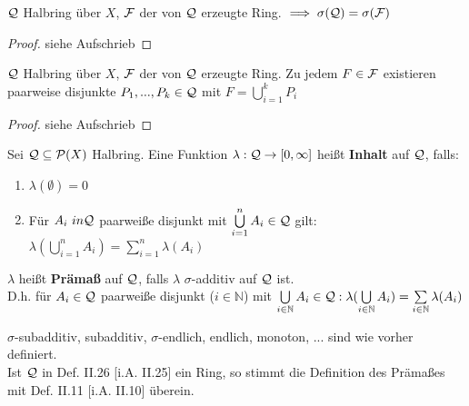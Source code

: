 \documentclass[11pt,a4paper,fleqn,openany]{report}
\begin{document}
    \begin{lemma}[i.A. II.23]
      $\mathcal{Q}$ Halbring über $X$, $\mathcal{F}$ der von $\mathcal{Q}$ erzeugte Ring. $\implies \sigma(\mathcal{Q}) = \sigma(\mathcal{F})$
    \end{lemma}

    \begin{proof}
      siehe Aufschrieb
    \end{proof}

    \begin{lemma}[i.A. II.24]
      $\mathcal{Q}$ Halbring über $X$, $\mathcal{F}$ der von $\mathcal{Q}$ erzeugte Ring. Zu jedem $F \in \mathcal{F}$ existieren paarweise disjunkte $P_1, ..., P_k \in \mathcal{Q}$ mit $F = \bigcup\limits_{i=1}^k P_i$
    \end{lemma}

    \begin{proof}
      siehe Aufschrieb
    \end{proof}

    \begin{definition}[i.A. II.25]
      Sei $\mathcal{Q} \subseteq \mathcal{P}(X)$ Halbring. Eine Funktion $\lambda: \mathcal{Q} \to [0, \infty]$ heißt \textbf{Inhalt} auf $\mathcal{Q}$, falls:
      \begin{enumerate}[label=\roman*)]
        \item $\lambda(\emptyset) = 0$
        \item Für $A_i \ in \mathcal{Q}$ paarweiße disjunkt mit $\bigcup\limits_{i=1}^n A_i \in \mathcal{Q}$ gilt: $\lambda(\bigcup\limits_{i=1}^n A_i) = \sum\limits_{i=1}^n \lambda(A_i)$
      \end{enumerate}
      $\lambda$ heißt \textbf{Prämaß} auf $\mathcal{Q}$, falls $\lambda$ $\sigma$-additiv auf $\mathcal{Q}$ ist.\\
      D.h. für $A_i \in \mathcal{Q}$ paarweiße disjunkt ($i \in \mathbb{N}$) mit $\bigcup\limits_{i \in \mathbb{N}} A_i \in \mathcal{Q}: \lambda(\bigcup\limits_{i \in \mathbb{N}} A_i) = \sum\limits_{i \in \mathbb{N}} \lambda(A_i)$
    \end{definition}

    \begin{remark}
      $\sigma$-subadditiv, subadditiv, $\sigma$-endlich, endlich, monoton, ... sind wie vorher definiert.\\
      Ist $\mathcal{Q}$ in Def. II.26 [i.A. II.25] ein Ring, so stimmt die Definition des Prämaßes mit Def. II.11 [i.A. II.10] überein.
    \end{remark}
\end{document}
